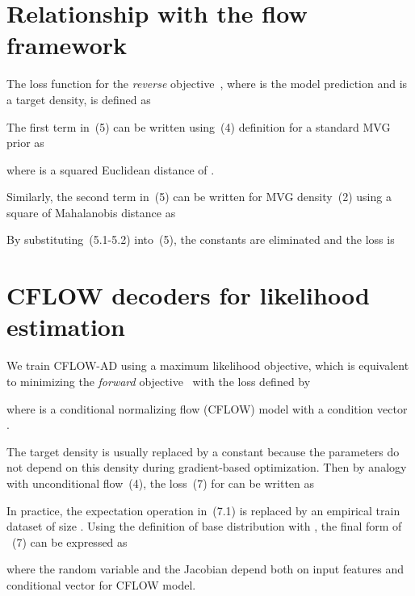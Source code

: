 \documentclass[10pt,twocolumn,letterpaper]{article}
\begin{document}
{\small


}

\ifwacvfinal
\clearpage{}\appendix
\section{Relationship with the flow framework}
The loss function for the \textit{reverse}  objective~\cite{JMLR:v22:19-1028}, where  is the model prediction and  is a target density, is defined as


The first term in~(5) can be written using~(4) definition for a standard MVG prior  as

where  is a squared Euclidean distance of .

Similarly, the second term in~(5) can be written for MVG density~(2) using a square of Mahalanobis distance as


By substituting~(5.1-5.2) into~(5), the constants  are eliminated and the loss is


\section{CFLOW decoders for likelihood estimation}
We train CFLOW-AD using a maximum likelihood objective, which is equivalent to minimizing the \textit{forward}  objective~\cite{JMLR:v22:19-1028} with the loss defined by


where  is a conditional normalizing flow (CFLOW) model with a condition vector .

The target density  is usually replaced by a constant because the parameters  do not depend on this density during gradient-based optimization. Then by analogy with unconditional flow~(4), the loss~(7) for  can be written as


In practice, the expectation operation in~(7.1) is replaced by an empirical train dataset  of size . Using the definition of base distribution with , the final form of ~(7) can be expressed as

where the random variable  and the Jacobian  depend both on input features  and conditional vector  for CFLOW model.\clearpage{}
\fi
\end{document}
